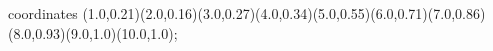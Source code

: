 					coordinates { (1.0,0.21)(2.0,0.16)(3.0,0.27)(4.0,0.34)(5.0,0.55)(6.0,0.71)(7.0,0.86)(8.0,0.93)(9.0,1.0)(10.0,1.0)};